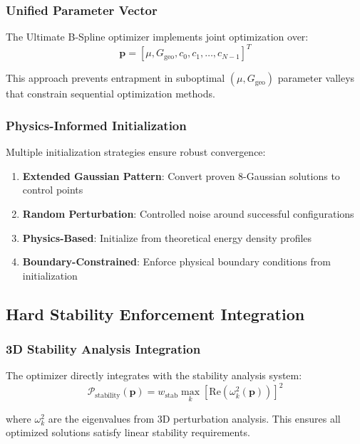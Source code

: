 \documentclass[11pt]{article}
\begin{document}
\subsubsection{Unified Parameter Vector}

The Ultimate B-Spline optimizer implements joint optimization over:
\begin{equation}
\mathbf{p} = [\mu, G_{\text{geo}}, c_0, c_1, \ldots, c_{N-1}]^T
\end{equation}

This approach prevents entrapment in suboptimal $(\mu, G_{\text{geo}})$ parameter valleys that constrain sequential optimization methods.

\subsubsection{Physics-Informed Initialization}

Multiple initialization strategies ensure robust convergence:
\begin{enumerate}
\item \textbf{Extended Gaussian Pattern}: Convert proven 8-Gaussian solutions to control points
\item \textbf{Random Perturbation}: Controlled noise around successful configurations
\item \textbf{Physics-Based}: Initialize from theoretical energy density profiles
\item \textbf{Boundary-Constrained}: Enforce physical boundary conditions from initialization
\end{enumerate}

\subsection{Hard Stability Enforcement Integration}

\subsubsection{3D Stability Analysis Integration}

The optimizer directly integrates with the stability analysis system:
\begin{equation}
\mathcal{P}_{\text{stability}}(\mathbf{p}) = w_{\text{stab}} \max_{k}[\text{Re}(\omega_k^2(\mathbf{p}))]^2
\end{equation}

where $\omega_k^2$ are the eigenvalues from 3D perturbation analysis. This ensures all optimized solutions satisfy linear stability requirements.
\end{document}
